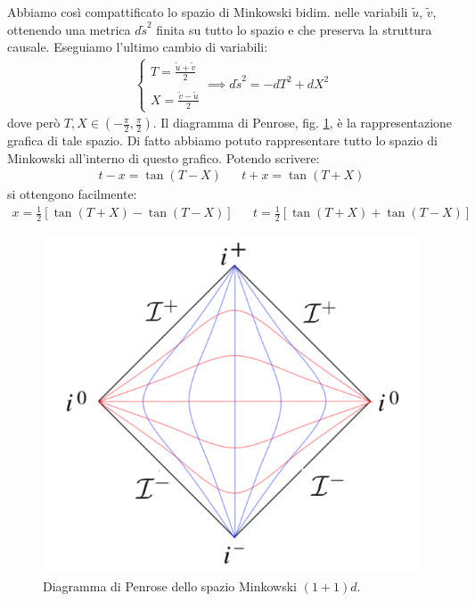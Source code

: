 Abbiamo così compattificato lo spazio di Minkowski bidim. nelle variabili $\tilde{u}$, $\tilde{v}$, ottenendo una metrica $d\tilde{s}^2$ finita su tutto lo spazio e che preserva la struttura causale. Eseguiamo l'ultimo cambio di variabili:
\begin{align*}
\left\{\begin{array}{l}
    T = \frac{\tilde{u}+\tilde{v}}{2} \\ \\
    X = \frac{\tilde{v}-\tilde{u}}{2}
\end{array}\right.
\implies d\tilde{s}^2 =-dT^2 + dX^2
\end{align*}
dove però $T, X \in ( -\frac{\pi}{2}, \frac{\pi}{2})$. Il diagramma di Penrose, fig. \ref{fig.pen_mink_11}, è la rappresentazione grafica di tale spazio. Di fatto abbiamo potuto rappresentare tutto lo spazio di Minkowski all'interno di questo grafico. Potendo scrivere:
\begin{align*}
    t - x = \tan(T-X) && t + x = \tan(T+X) 
\end{align*}
si ottengono facilmente:
\begin{align*}
    x = \frac{1}{2}\left[ \tan(T+X) - \tan(T-X)\right] && t = \frac{1}{2}\left[ \tan(T+X) + \tan(T-X)\right]
\end{align*}
\begin{figure}
    \centering
    \includegraphics[scale=0.58]{immagini/penrose_mink_11.png}
    \caption{Diagramma di Penrose dello spazio Minkowski $(1+1)d$.}
    \label{fig.pen_mink_11}
\end{figure}

